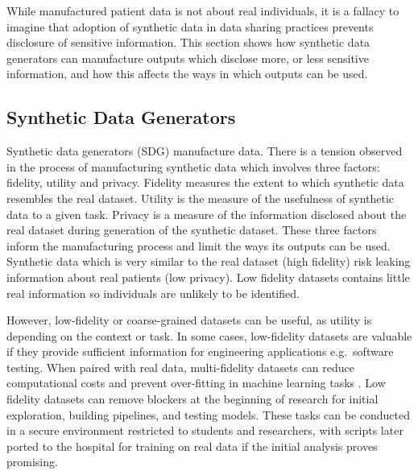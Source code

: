 \documentclass[11pt]{article}
\begin{document}
While manufactured patient data is not about real individuals, it is a fallacy to imagine that adoption of synthetic data in data sharing practices prevents disclosure of sensitive information. This section shows how synthetic data generators can manufacture outputs which disclose more, or less sensitive information, and how this affects the ways in which outputs can be used.

\subsection{Synthetic Data Generators}


Synthetic data generators (SDG) manufacture data. There is a tension observed in the process of manufacturing synthetic data which involves three factors: fidelity, utility and privacy. Fidelity measures the extent to which synthetic data resembles the real dataset. Utility is the measure of the usefulness of synthetic data to a given task. Privacy is a measure of the information disclosed about the real dataset during generation of the synthetic dataset. These three factors inform the manufacturing process and limit the ways its outputs can be used. Synthetic data which is very similar to the real dataset (high fidelity) risk leaking information about real patients (low privacy). Low fidelity datasets contains little real information so individuals are unlikely to be identified. 

However, low-fidelity or coarse-grained datasets can be useful, as utility is depending on the context or task. In some cases, low-fidelity datasets are valuable if they provide sufficient information for engineering applications e.g.\ software testing. When paired with real data, multi-fidelity datasets can  reduce computational costs and prevent over-fitting in machine learning tasks \cite{Patra2020}\cite{Santoni2024}\cite{berkson2019}. Low fidelity datasets can remove blockers at the beginning of research for initial exploration, building pipelines, and testing models. These tasks can be conducted in a secure environment restricted to students and researchers, with scripts later ported to the hospital for training on real data if the initial analysis proves promising.
\end{document}

